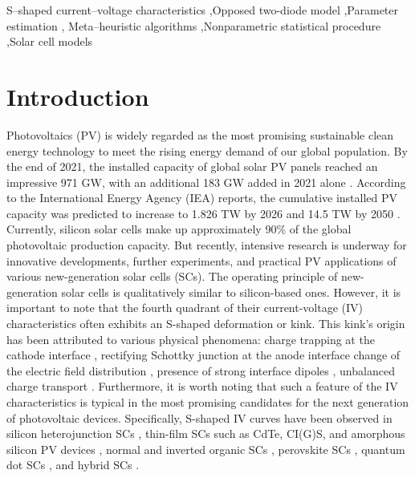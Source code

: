 \documentclass[a4paper,fleqn]{cas-dc}
\begin{document}
\begin{keywords}
S--shaped current--voltage characteristics \sep Opposed two-diode model \sep Parameter estimation \sep
Meta--heuristic algorithms \sep Nonparametric statistical procedure \sep Solar cell models
\end{keywords}

\maketitle

\section{Introduction}\label{Int}

Photovoltaics (PV) is widely regarded as the most promising sustainable
clean energy technology to meet the rising energy demand of our global population.
By the end of 2021, the installed capacity of global solar PV panels reached an impressive 971 GW,
with an additional 183 GW added in 2021 alone \cite{Divya2023}.
According to the International Energy Agency (IEA) reports, the cumulative installed PV capacity
was predicted to increase to 1.826 TW by 2026 and 14.5 TW by 2050 \cite{Wang2022}.
Currently, silicon solar cells make up approximately 90\% of the global photovoltaic production capacity.
But recently, intensive research is underway for innovative developments,
further experiments, and practical PV applications of various new-generation solar cells (SCs).
The operating principle of new-generation solar cells is qualitatively similar to silicon-based ones.
However, it is important to note that the fourth quadrant of their current-voltage (IV) characteristics
often exhibits an S-shaped deformation or kink.
This kink’s origin has been attributed to various physical phenomena:
charge trapping at the cathode interface \cite{Sesa2019,Finck2013},
rectifying Schottky junction at the anode interface \cite{Zuo2014}
change of the electric field distribution \cite{Castro2010},
presence of strong interface dipoles \cite{Romero2017},
unbalanced charge transport \cite{Gao2011}.
Furthermore, it is worth noting that such a feature of the IV characteristics is typical
in the most promising candidates for the next generation of photovoltaic devices.
Specifically, S-shaped IV curves have been observed in silicon heterojunction SCs \cite{Saive2019}, 
thin-film SCs such as CdTe, CI(G)S, and amorphous silicon PV devices \cite{Saive2019,Roland2016}, 
normal and inverted organic SCs \cite{Gaur2014,Tran2017,Lastra2019}, 
perovskite SCs \cite{Saive2019,Xu2016}, 
quantum dot SCs \cite{Gao2011,Yu2019a}, 
and hybrid SCs \cite{VeinbergVidal2016,Romero2017,Finck2013}.
\end{document}
